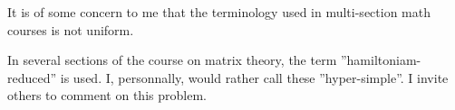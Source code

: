 \documentclass{sample}
\begin{document}
It is of some concern to me that
the terminology used in multi-section
math courses is not uniform.

In several sections of the course on
matrix theory, the term
''hamiltoniam-reduced'' is used.
I, personnally, would rather call these
''hyper-simple''. I invite others 
to comment on this problem.
\end{document}
